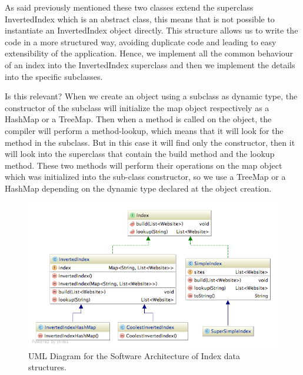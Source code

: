 As said previously mentioned these two classes extend the superclass InvertedIndex which is an abstract class, this means that is not possible to instantiate an InvertedIndex object directly. This structure allows us to write the code in a more structured way, avoiding duplicate code and leading to easy extensibility of the application. Hence, we implement all the common behaviour of an index into the InvertedIndex superclass and then we implement the details into the specific subclasses.

Is this relevant?
When we create an object using a subclass as dynamic type, the constructor of the subclass will initialize the map object respectively as a HashMap or a TreeMap. Then when a method is called on the object, the compiler will perform a method-lookup, which means that it will look for the method in the subclass. But in this case it will find only the constructor, then it will look into the superclass that contain the build method and the lookup method. These two methods will perform their operations on the map object which was initialized into the sub-class constructor, so we use a TreeMap or a HashMap depending on the dynamic type declared at the object creation.


\begin{figure}[t]
	\centering
	\includegraphics[width=\textwidth]{graphics/diagram-index.png}
	\caption{UML Diagram for the Software Architecture of Index data structures.}
	\label{fig:index:uml}
\end{figure}



